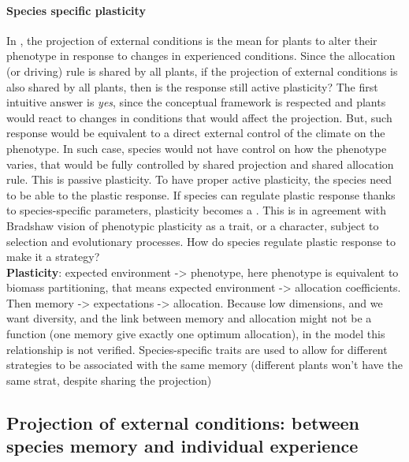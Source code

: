 \paragraph{Species specific plasticity}
In \model, the projection of external conditions is the mean for plants to alter their phenotype in response to changes in experienced conditions. Since the allocation (or driving) rule is shared by all plants, if the projection of external conditions is also shared by all plants, then is the response still active plasticity? The first intuitive answer is \textit{yes}, since the conceptual framework is respected and plants would react to changes in conditions that would affect the projection. But, such response would be equivalent to a direct external control of the climate on the phenotype. In such case, species would not have control on how the phenotype varies, that would be fully controlled by shared projection and shared allocation rule. This is passive plasticity. To have proper active plasticity, the species need to be able to  the plastic response. If species can regulate plastic response thanks to species-specific parameters, plasticity becomes a . This is in agreement with Bradshaw vision of phenotypic plasticity as a trait, or a character, subject to selection and evolutionary processes\cite{bradshaw_evolutionary_1965, bradshaw_unravelling_2006}. How do species regulate plastic response to make it a strategy?\\

\textbf{Plasticity}: expected environment -> phenotype, here phenotype is equivalent to biomass partitioning, that means expected environment -> allocation coefficients. Then memory -> expectations -> allocation. Because low dimensions, and we want diversity, and the link between memory and allocation might not be a function (one memory give exactly one optimum allocation), in the model this relationship is not verified. Species-specific traits are used to allow for different strategies to be associated with the same memory (different plants won't have the same strat, despite sharing the projection)\\


\subsection{Projection of external conditions: between species memory and individual experience}

